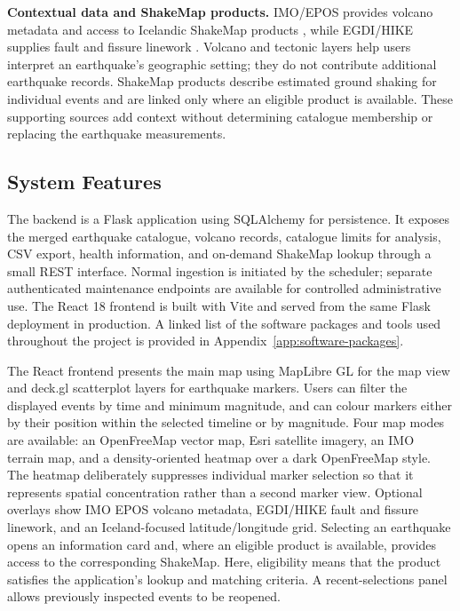 \documentclass[12pt]{article}
\begin{document}
\textbf{Contextual data and ShakeMap products.} IMO/EPOS provides volcano metadata and access to Icelandic ShakeMap products \cite{imo_epos_api}, while EGDI/HIKE supplies fault and fissure linework \cite{egdi_hike_iceland_tectonics}. Volcano and tectonic layers help users interpret an earthquake's geographic setting; they do not contribute additional earthquake records. ShakeMap products describe estimated ground shaking for individual events and are linked only where an eligible product is available. These supporting sources add context without determining catalogue membership or replacing the earthquake measurements.

\subsection*{System Features}
The backend is a Flask application using SQLAlchemy for persistence. It exposes the merged earthquake catalogue, volcano records, catalogue limits for analysis, CSV export, health information, and on-demand ShakeMap lookup through a small REST interface. Normal ingestion is initiated by the scheduler; separate authenticated maintenance endpoints are available for controlled administrative use. The React 18 frontend is built with Vite and served from the same Flask deployment in production. A linked list of the software packages and tools used throughout the project is provided in Appendix~\ref{app:software-packages}.

The React frontend presents the main map using MapLibre GL for the map view and deck.gl scatterplot layers for earthquake markers. Users can filter the displayed events by time and minimum magnitude, and can colour markers either by their position within the selected timeline or by magnitude. Four map modes are available: an OpenFreeMap vector map, Esri satellite imagery, an IMO terrain map, and a density-oriented heatmap over a dark OpenFreeMap style. The heatmap deliberately suppresses individual marker selection so that it represents spatial concentration rather than a second marker view. Optional overlays show IMO EPOS volcano metadata, EGDI/HIKE fault and fissure linework, and an Iceland-focused latitude/longitude grid. Selecting an earthquake opens an information card and, where an eligible product is available, provides access to the corresponding ShakeMap. Here, eligibility means that the product satisfies the application's lookup and matching criteria. A recent-selections panel allows previously inspected events to be reopened.
\end{document}
